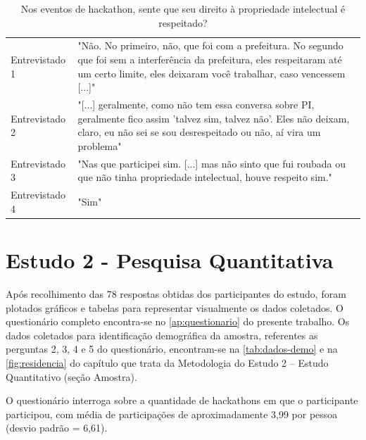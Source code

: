 \begin{table}[H]
\centering
\caption{Nos eventos de hackathon, sente que seu direito à propriedade intelectual é respeitado?}
\label{tab:respeito}
\begin{tabular}{l|p{}}
Entrevistado 1 &
  "Não. No primeiro, não, que foi com a prefeitura. No segundo que foi sem a interferência da prefeitura, eles respeitaram até um certo limite, eles deixaram você trabalhar, caso vencessem {[}...{]}" \\
Entrevistado 2 &
  "{[}...{]} geralmente, como não tem essa conversa sobre PI, geralmente fico assim 'talvez sim, talvez não'. Eles não deixam, claro, eu não sei se sou desrespeitado ou não, aí vira um problema" \\
Entrevistado 3 & "Nas que participei sim. {[}...{]} mas não sinto que fui roubada ou que não tinha propriedade intelectual, houve respeito sim." \\
Entrevistado 4 & "Sim"                                                                                                                          
\end{tabular}
\end{table}





















\section{Estudo 2 - Pesquisa Quantitativa}

Após recolhimento das 78 respostas obtidas dos participantes do estudo, foram plotados gráficos e tabelas para representar visualmente os dados coletados. O questionário completo encontra-se no \autoref{ap:questionario} do presente trabalho. Os dados coletados para identificação demográfica da amostra,  referentes as perguntas 2, 3, 4 e 5 do questionário, encontram-se na \autoref{tab:dados-demo} e na \autoref{fig:residencia} do capítulo que trata da Metodologia do Estudo 2 – Estudo Quantitativo (seção Amostra).


O questionário interroga sobre a quantidade de hackathons em que o participante participou, com média de participações de aproximadamente 3,99 por pessoa (desvio padrão = 6,61). %

